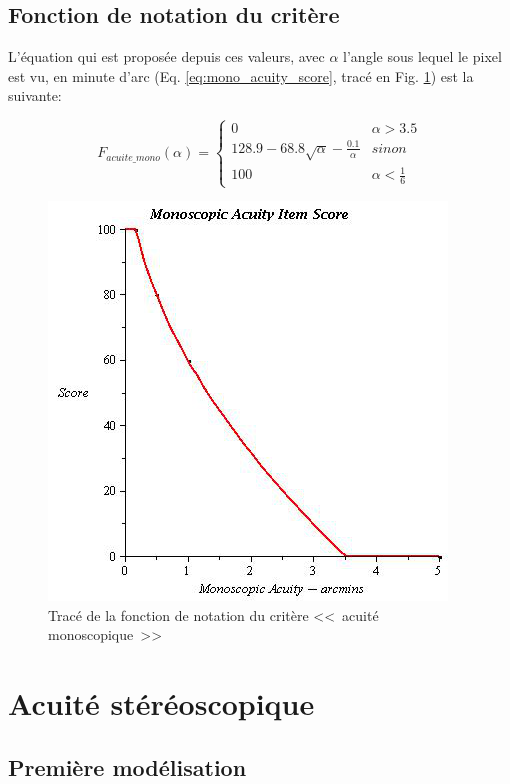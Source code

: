 	\subsection{Fonction de notation du critère}
	\par L'équation qui est proposée depuis ces valeurs, avec $\alpha$ l'angle sous lequel le pixel est vu, en minute d'arc (Eq. \ref{eq:mono_acuity_score}, tracé en Fig. \ref{fig:score_mono_acuity}) est la suivante:
	
	\begin{equation}
		F_{acuite\_mono}(\alpha) = \begin{cases}
		0 & \alpha > 3.5\\
		128.9 - 68.8 \sqrt{\alpha} - \frac{0.1}{\alpha} & sinon\\
		100 & \alpha < \frac{1}{6}
		\end{cases}
		\label{eq:mono_acuity_score}
	\end{equation}

	\begin{figure}
		\centering
		\includegraphics[scale=.75]{Figures/AcuityMono}
		\caption{Tracé de la fonction de notation du critère <<~acuité monoscopique~>>}
		\label{fig:score_mono_acuity}
	\end{figure}
	
	\section{Acuité stéréoscopique}
	\subsection{Première modélisation}	
